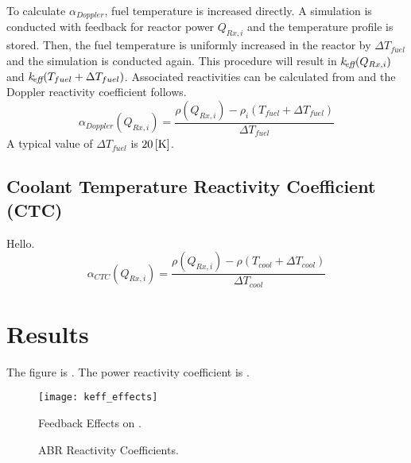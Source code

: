     To calculate $\alpha_{Doppler}$, fuel temperature is increased directly. A
    simulation is conducted with feedback for reactor power $Q_{Rx,i}$ and the
    temperature profile is stored. Then, the fuel temperature is uniformly 
    increased in the reactor by $\Delta T_{fuel}$ and the simulation is
    conducted again. This procedure will result in $k_{\!\mbox{\scriptsize \em eff}}(Q_{Rx,i})$ and
    ${k_{\!\mbox{\scriptsize \em eff}}(T_{fuel} + \Delta T_{fuel})}$. Associated reactivities can be
    calculated from  and the Doppler reactivity coefficient
    follows.
    \begin{equation}
      \label{eq:doppler_reactivity_coefficient}
      \alpha_{Doppler}(Q_{Rx,i}) = \frac{\rho(Q_{Rx,i}) - \rho_i(T_{fuel} +
        \Delta T_{fuel})} {\Delta T_{fuel}}
    \end{equation}
    A typical value of $\Delta T_{fuel}$ is $20\left[\text{{K}}\right]$.

  \subsection{Coolant Temperature Reactivity Coefficient (CTC)}
  \label{sec:coolant_temperature_reactivity_coefficient}
    Hello.
    \begin{equation}
      \label{eq:coolant_temperature_reactivity_coefficient}
      \alpha_{CTC}(Q_{Rx,i}) = \frac{\rho(Q_{Rx,i}) - \rho(T_{cool} + 
        \Delta T_{cool})} {\Delta T_{cool}}
    \end{equation}

\section{Results}
\label{sec:results}
  The figure is . The power reactivity
  coefficient is .

  \begin{figure}
    \centering
    \texttt{[image: keff\_effects]}
    \caption{Feedback Effects on \keff.}
    \label{fig:keff_effects}
  \end{figure}

  \begin{figure}
    \centering
    \hspace*{\fill}
    \vspace{\baselineskip}
    \hspace*{\fill}
    \caption{ABR Reactivity Coefficients.}
    \label{fig:abr_reactivity_coefficients}
  \end{figure}
